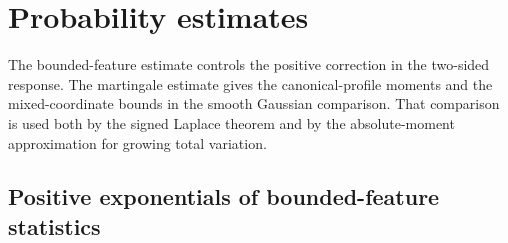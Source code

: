 \documentclass[11pt,reqno]{amsart}
\numberwithin{equation}{section}
\theoremstyle{plain}
\theoremstyle{remark}
\begin{document}
\section{Probability estimates}
\label{app:probability-estimates}
\label{app:quantitative-growing-marginals}

The bounded-feature estimate controls the positive correction in the two-sided response.  The martingale estimate gives the canonical-profile moments and the mixed-coordinate bounds in the smooth Gaussian comparison.  That comparison is used both by the signed Laplace theorem and by the absolute-moment approximation for growing total variation.

\subsection{Positive exponentials of bounded-feature statistics}
\label{app:quantitative-replica-response}
\label{subsec:bounded-feature-exponentials}
\end{document}
